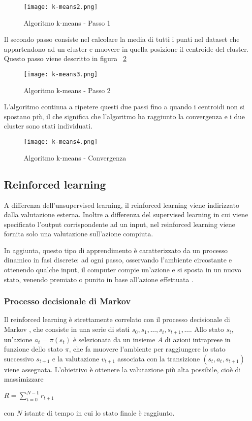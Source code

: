\documentclass[../main.tex]{subfiles}
\begin{document}
\begin{figure}[H]
				\centering
				\texttt{[image: k-means2.png]}
				\caption{Algoritmo k-means - Passo 1}
				\label{fig:means2}
\end{figure}

Il secondo passo consiste nel calcolare la media di tutti i punti nel dataset che appartendono ad un cluster e muovere in quella posizione il centroide del cluster. Questo passo viene descritto in figura ~\ref{fig:means3}

\begin{figure}[H]
				\centering
				\texttt{[image: k-means3.png]}
				\caption{Algoritmo k-means - Passo 2}
				\label{fig:means3}
\end{figure}

L'algoritmo continua a ripetere questi due passi fino a quando i centroidi non si spostano più, il che significa che l'algoritmo ha raggiunto la convergenza e i due cluster sono stati individuati.

\begin{figure}[H]
				\centering
				\texttt{[image: k-means4.png]}
				\caption{Algoritmo k-means - Convergenza}
\end{figure}

\subsection{Reinforced learning}
A differenza dell'unsupervised learning, il reinforced learning viene indirizzato dalla valutazione esterna. Inoltre a differenza del supervised learning in cui viene specificato l'output corrispondente ad un input, nel reinforced learning viene fornita solo una valutazione sull'azione compiuta.

In aggiunta, questo tipo di apprendimento è caratterizzato da un processo dinamico in fasi discrete: ad ogni passo, osservando l'ambiente circostante e ottenendo qualche input, il computer compie un'azione e si sposta in un nuovo stato, venendo premiato o punito in base all'azione effettuata \cite{compIntelligence}.

\subsubsection{Processo decisionale di Markov}
Il reinforced learning è strettamente correlato con il processo decisionale di Markov \cite{compIntelligence}, che consiste in una serie di stati $s _ { 0 } , s _ { 1 } , \ldots , s _ { t } , s _ { t + 1 } , \ldots$. Allo stato ${ s } _ { t }$, un'azione $a _ { t } = \pi \left( s _ { t } \right)$ è selezionata da un insieme $A$ di azioni intraprese in funzione dello stato $\pi$, che fa muovere l'ambiente per raggiungere lo stato successivo $s _ { t  + 1}$ e la valutazione $v _ {t + 1}$ associata con la transizione $\left( s _ { t } , a _ { t } , s _ { t + 1 } \right)$ viene assegnata. L'obiettivo è ottenere la valutazione più alta possibile, cioè di massimizzare 

\begin{center}
				\begin{math}
								R = \sum _ { t = 0 } ^ { N - 1 } r _ { t + 1 }
				\end{math}
\end{center}

con $N$ istante di tempo in cui lo stato finale è raggiunto.
\end{document}
